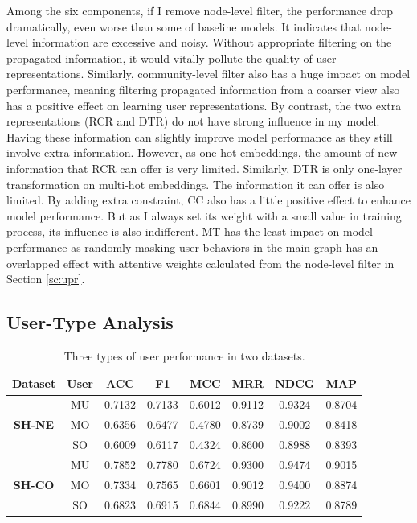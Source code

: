 Among the six components, if I remove node-level filter, the performance drop dramatically, even worse than some of baseline models. It indicates that node-level information are excessive and noisy. Without appropriate filtering on the propagated information, it would vitally pollute the quality of user representations. Similarly,  community-level filter also has a huge impact on model performance, meaning filtering propagated information from a coarser view also has a positive effect on learning user representations. By contrast, the two extra representations (RCR and DTR) do not have strong influence in my model. Having these information can slightly improve model performance as they still involve extra information. However, as one-hot embeddings, the amount of new information that RCR can offer is very limited. Similarly, DTR is only one-layer transformation on multi-hot embeddings. The information it can offer is also limited. By adding extra constraint, CC also has a little positive effect to enhance model performance. But as I always set its weight with a small value in training process, its influence is also indifferent. MT has the least impact on model performance as randomly masking user behaviors in the main graph has an overlapped effect with attentive weights calculated from the node-level filter in Section \ref{sc:upr}.

\subsection{User-Type Analysis}
\label{sc:ua}
\begin{table}[h]
	
	\centering
	\begin{tabular}{|c|c|c|c|c|c|c|c|} 
		\hline
		\textbf{Dataset}& \textbf{User}	
		& \textbf{ACC}& \textbf{F1}& \textbf{MCC}& \textbf{MRR} & \textbf{NDCG}& \textbf{MAP}\\ \hline
		\multirow{3}{*}{ \textbf{SH-NE}} & MU & 0.7132 & 0.7133 & 0.6012&  0.9112 & 0.9324 & 0.8704  \\   
		& MO & 0.6356 & 0.6477 & 0.4780&  0.8739 & 0.9002 & 0.8418 \\
		& SO & 0.6009 & 0.6117 & 0.4324&  0.8600 & 0.8988 & 0.8393 \\
		\hline
		\multirow{3}{*}{ \textbf{SH-CO}} & MU & 0.7852& 0.7780& 0.6724& 0.9300& 0.9474& 0.9015 \\   
		& MO & 0.7334& 0.7565& 0.6601& 0.9012& 0.9400& 0.8874\\
		& SO & 0.6823& 0.6915& 0.6844& 0.8990& 0.9222& 0.8789 \\\hline
	\end{tabular}
	\caption{Three types of user performance in two datasets.}
	\label{tab:ua}
\end{table} 

